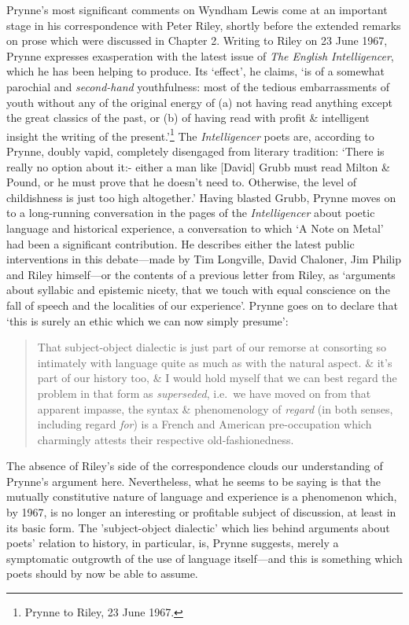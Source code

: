 \documentclass[]{article}
\begin{document}
Prynne's most significant comments on Wyndham Lewis come at an important
stage in his correspondence with Peter Riley, shortly before the
extended remarks on prose which were discussed in Chapter 2. Writing to
Riley on 23 June 1967, Prynne expresses exasperation with the latest
issue of \emph{The English Intelligencer}, which he has been helping to
produce. Its `effect', he claims, `is of a somewhat parochial and
\emph{second-hand} youthfulness: most of the tedious embarrassments of
youth without any of the original energy of (a) not having read anything
except the great classics of the past, or (b) of having read with profit
\& intelligent insight the writing of the present.'\footnote{Prynne to
  Riley, 23 June 1967.} The \emph{Intelligencer} poets are, according to
Prynne, doubly vapid, completely disengaged from literary tradition:
`There is really no option about it:- either a man like {[}David{]}
Grubb must read Milton \& Pound, or he must prove that he doesn't need
to. Otherwise, the level of childishness is just too high altogether.'
Having blasted Grubb, Prynne moves on to a long-running conversation in
the pages of the \emph{Intelligencer} about poetic language and
historical experience, a conversation to which `A Note on Metal' had
been a significant contribution. He describes either the latest public
interventions in this debate---made by Tim Longville, David Chaloner,
Jim Philip and Riley himself---or the contents of a previous letter from
Riley, as `arguments about syllabic and epistemic nicety, that we touch
with equal conscience on the fall of speech and the localities of our
experience'. Prynne goes on to declare that `this is surely an ethic
which we can now simply presume':

\begin{quote}
That subject-object dialectic is just part of our remorse at consorting
so intimately with language quite as much as with the natural aspect. \&
it's part of our history too, \& I would hold myself that we can best
regard the problem in that form as \emph{superseded}, i.e.~we have moved
on from that apparent impasse, the syntax \& phenomenology of
\emph{regard} (in both senses, including regard \emph{for}) is a French
and American pre-occupation which charmingly attests their respective
old-fashionedness.
\end{quote}

\noindent The absence of Riley's side of the correspondence clouds our
understanding of Prynne's argument here. Nevertheless, what he seems to
be saying is that the mutually constitutive nature of language and
experience is a phenomenon which, by 1967, is no longer an interesting
or profitable subject of discussion, at least in its basic form. The
'subject-object dialectic' which lies behind arguments about poets'
relation to history, in particular, is, Prynne suggests, merely a
symptomatic outgrowth of the use of language itself---and this is
something which poets should by now be able to assume.
\end{document}
